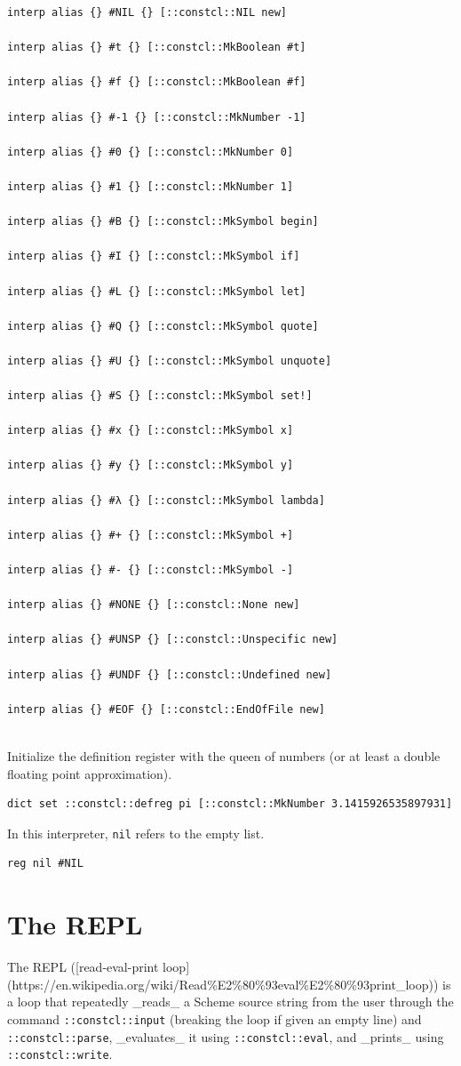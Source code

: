 \documentclass[twoside,9pt]{report}
\begin{document}
\noindent\makebox[\linewidth]{\rule{\linewidth}{0.4pt}}
\begin{lstlisting}
interp alias {} #NIL {} [::constcl::NIL new]
 
interp alias {} #t {} [::constcl::MkBoolean #t]
 
interp alias {} #f {} [::constcl::MkBoolean #f]
 
interp alias {} #-1 {} [::constcl::MkNumber -1]
 
interp alias {} #0 {} [::constcl::MkNumber 0]
 
interp alias {} #1 {} [::constcl::MkNumber 1]
 
interp alias {} #B {} [::constcl::MkSymbol begin]
 
interp alias {} #I {} [::constcl::MkSymbol if]
 
interp alias {} #L {} [::constcl::MkSymbol let]
 
interp alias {} #Q {} [::constcl::MkSymbol quote]
 
interp alias {} #U {} [::constcl::MkSymbol unquote]
 
interp alias {} #S {} [::constcl::MkSymbol set!]
 
interp alias {} #x {} [::constcl::MkSymbol x]
 
interp alias {} #y {} [::constcl::MkSymbol y]
 
interp alias {} #λ {} [::constcl::MkSymbol lambda]
 
interp alias {} #+ {} [::constcl::MkSymbol +]
 
interp alias {} #- {} [::constcl::MkSymbol -]
 
interp alias {} #NONE {} [::constcl::None new]
 
interp alias {} #UNSP {} [::constcl::Unspecific new]
 
interp alias {} #UNDF {} [::constcl::Undefined new]
 
interp alias {} #EOF {} [::constcl::EndOfFile new]
 
\end{lstlisting}
\noindent\makebox[\linewidth]{\rule{\linewidth}{0.4pt}}

Initialize the definition register with the queen of numbers (or at least a double floating point approximation).

\noindent\makebox[\linewidth]{\rule{\linewidth}{0.4pt}}
\begin{lstlisting}
dict set ::constcl::defreg pi [::constcl::MkNumber 3.1415926535897931]
\end{lstlisting}
\noindent\makebox[\linewidth]{\rule{\linewidth}{0.4pt}}

In this interpreter, \texttt{nil} refers to the empty list.

\noindent\makebox[\linewidth]{\rule{\linewidth}{0.4pt}}
\begin{lstlisting}
reg nil #NIL
\end{lstlisting}
\noindent\makebox[\linewidth]{\rule{\linewidth}{0.4pt}}
\chapter{The REPL}
\label{the-repl}

The REPL ([read-eval-print loop](https://en.wikipedia.org/wiki/Read\%E2\%80\%93eval\%E2\%80\%93print\_loop)) is a loop that repeatedly \_reads\_ a Scheme source string from the user through the command \texttt{::constcl::input} (breaking the loop if given an empty line) and \texttt{::constcl::parse}, \_evaluates\_ it using \texttt{::constcl::eval}, and \_prints\_ using \texttt{::constcl::write}.
\end{document}
